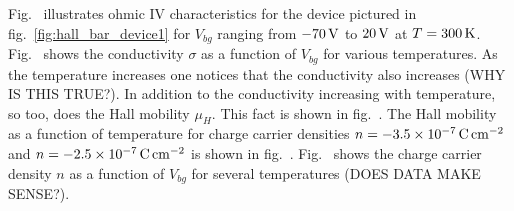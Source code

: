 \noindent Fig.~ illustrates ohmic IV characteristics for the device pictured in fig.~\ref{fig:hall_bar_device1} for $V_{bg}$ ranging from $-70\,\mathrm{V}$ to $20\,\mathrm{V}$ at $T=300\,\mathrm{K}$. Fig.~ shows the conductivity $\sigma$ as a function of $V_{bg}$ for various temperatures. As the temperature increases one notices that the conductivity also increases (WHY IS THIS TRUE?). In addition to the conductivity increasing with temperature, so too, does the Hall mobility $\mu_H$. This fact is shown in fig.~. The Hall mobility as a function of temperature for charge carrier densities $n=-3.5\times 10^{-7}\,\mathrm{C}\,\mathrm{cm}^{-2}$ and $n=-2.5\times 10^{-7}\,\mathrm{C}\,\mathrm{cm}^{-2}$ is shown in fig.~. Fig.~ shows the charge carrier density $n$ as a function of $V_{bg}$ for several temperatures (DOES DATA MAKE SENSE?). 

